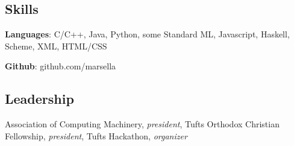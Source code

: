\documentclass{article}
\newcommand{\skill}[2]{
  \textbf{#1}: #2
  \smallskip
}
\begin{document}
\subsection*{Skills}
  \skill{Languages} {C/C++, Java, Python, some Standard ML, Javascript,
                    Haskell, Scheme, XML, HTML/CSS} %
  \skill{Github}    {github.com/marsella}

\subsection*{Leadership}
  Association of Computing Machinery, \textit{president}, Tufts Orthodox
  Christian Fellowship, \textit{president}, Tufts Hackathon,
  \textit{organizer}
\end{document}
